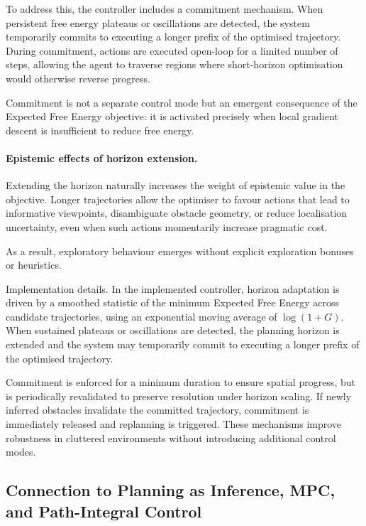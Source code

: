 \documentclass[a4paper, twoside]{article}
\begin{document}
To address this, the controller includes a commitment mechanism. When persistent
free energy plateaus or oscillations are detected, the system temporarily commits
to executing a longer prefix of the optimised trajectory. During commitment,
actions are executed open-loop for a limited number of steps, allowing the agent
to traverse regions where short-horizon optimisation would otherwise reverse
progress.

Commitment is not a separate control mode but an emergent consequence of the
Expected Free Energy objective: it is activated precisely when local gradient
descent is insufficient to reduce free energy.

\paragraph{Epistemic effects of horizon extension.}
Extending the horizon naturally increases the weight of epistemic value in the
objective. Longer trajectories allow the optimiser to favour actions that lead
to informative viewpoints, disambiguate obstacle geometry, or reduce localisation
uncertainty, even when such actions momentarily increase pragmatic cost.

As a result, exploratory behaviour emerges without explicit exploration bonuses
or heuristics.

Implementation details. In the implemented controller, horizon adaptation is driven by a smoothed statistic of the minimum Expected Free Energy across candidate trajectories, using an exponential moving average of $\log(1 + G)$. When sustained plateaus or oscillations are detected, the planning horizon is extended and the system may temporarily commit to executing a longer prefix of the optimised trajectory.

Commitment is enforced for a minimum duration to ensure spatial progress, but is periodically revalidated to preserve resolution under horizon scaling. If newly inferred obstacles invalidate the committed trajectory, commitment is immediately released and replanning is triggered. These mechanisms improve robustness in cluttered environments without introducing additional control modes.



\subsection{Connection to Planning as Inference, MPC, and Path-Integral Control}
\end{document}
